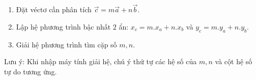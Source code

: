 \begin{enumerate}
\item Đặt véctơ cần phân tích $\overrightarrow{c} = m\overrightarrow{a} + n\overrightarrow{b}$.
\item Lập hệ phương trình bậc nhất $2$ ẩn: $x_c = m.x_a + n.x_b$ và $y_c = m.y_a + n.y_b$.
\item Giải hệ phương trình tìm cặp số $m, n$.
\end{enumerate}
Lưu ý: Khi nhập máy tính giải hệ, chú ý thứ tự các hệ số của $m, n$ và cột hệ số tự do tương ứng.
